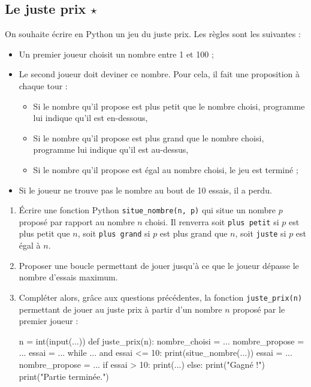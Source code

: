 \documentclass[12pt,a4paper, oneside]{article}
\theoremstyle{definition}
\begin{document}
   \subsection{Le juste prix $\star$}\label{subsec:le-juste-prix}
   On souhaite écrire en Python un jeu du juste prix.
   Les règles sont les suivantes :
   \begin{itemize}
      \item Un premier joueur choisit un nombre entre 1 et 100 ;
      \item Le second joueur doit deviner ce nombre.
      Pour cela, il fait une proposition à chaque tour :
      \begin{itemize}
         \item Si le nombre qu'il propose est plus petit que le nombre choisi, programme lui indique qu'il est en-dessous,
         \item Si le nombre qu'il propose est plus grand que le nombre choisi, programme lui indique qu'il est au-dessus,
         \item Si le nombre qu'il propose est égal au nombre choisi, le jeu est terminé ;
      \end{itemize}
      \item Si le joueur ne trouve pas le nombre au bout de 10 essais, il a perdu.
   \end{itemize}

   \begin{enumerate}
      \item Écrire une fonction Python \texttt{situe\_nombre(n, p)} qui situe un nombre $p$ proposé par rapport au nombre $n$ choisi.
      Il renverra soit \texttt{plus petit} si $p$ est plus petit que $n$, soit \texttt{plus grand} si $p$ est plus grand que $n$, soit \texttt{juste} si $p$ est égal à $n$.
      \item Proposer une boucle permettant de jouer jusqu'à ce que le joueur dépasse le nombre d'essais maximum.
      \item Compléter alors, grâce aux questions précédentes, la fonction \texttt{juste\_prix(n)} permettant de jouer au juste prix à partir d'un nombre $n$ proposé par le premier joueur :
      \begin{pyverbatim}
         n = int(input(...))
         def juste_prix(n):
            nombre_choisi = ...
            nombre_propose = ...
            essai = ...
            while ... and essai <= 10:
               print(situe_nombre(...))
               essai = ...
               nombre_propose = ...
            if essai > 10:
               print(...)
            else:
               print("Gagné !")
            print("Partie terminée.")
      \end{pyverbatim}
   \end{enumerate}
\end{document}
